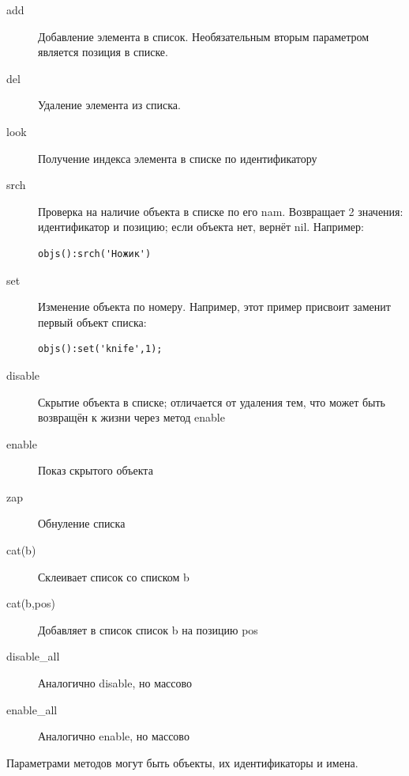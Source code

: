\documentclass[a4paper,12pt]{article}
\begin{document}
\begin{description}
\item[add]  Добавление элемента в список. Необязательным вторым параметром является позиция в списке.
\item[del]  Удаление элемента из списка.
\item[look]  Получение индекса элемента в списке по идентификатору
\item[srch]  Проверка на наличие объекта в списке по его nam. Возвращает 2 значения: идентификатор и позицию; если объекта нет, вернёт nil. Например: \begin{verbatim}objs():srch('Ножик')\end{verbatim}
\item[set]  Изменение объекта по номеру. Например, этот пример присвоит заменит первый объект списка: \begin{verbatim}objs():set('knife',1);\end{verbatim}
\item[disable]  Скрытие объекта в списке; отличается от удаления тем, что может быть возвращён к жизни через метод enable
\item[enable]  Показ скрытого объекта
\item[zap]  Обнуление списка
\item[cat(b)]  Склеивает список со списком b
\item[cat(b,pos)] Добавляет в список список b на позицию pos
\item[disable\_all]  Аналогично disable, но массово
\item[enable\_all]  Аналогично enable, но массово
\end{description}

Параметрами методов могут быть объекты, их идентификаторы и имена.
\end{document}
